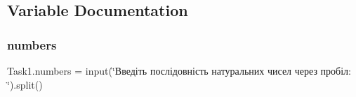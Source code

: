 \subsection{Variable Documentation}
\mbox{\label{namespace_task1_a8688e924bd52aeda371ffca58506db7f}} 
\subsubsection{\texorpdfstring{numbers}{numbers}}
{\footnotesize\ttfamily Task1.\+numbers = input(\char`\"{}Введіть послідовність натуральних чисел через пробіл\+: \char`\"{}).split()}

